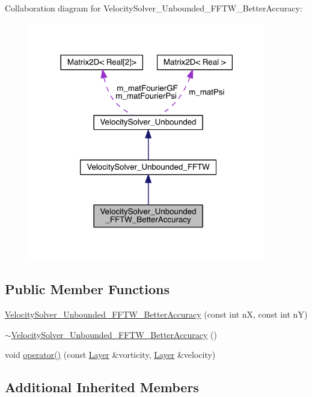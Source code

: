 Collaboration diagram for Velocity\+Solver\+\_\+\+Unbounded\+\_\+\+F\+F\+T\+W\+\_\+\+Better\+Accuracy\+:\nopagebreak
\begin{figure}[H]
\begin{center}
\leavevmode
\includegraphics[width=294pt]{dd/dd1/class_velocity_solver___unbounded___f_f_t_w___better_accuracy__coll__graph}
\end{center}
\end{figure}
\subsection*{Public Member Functions}
\begin{DoxyCompactItemize}
\item 
\hyperlink{class_velocity_solver___unbounded___f_f_t_w___better_accuracy_a83c87183908cd6a75e46c789156db1de}{Velocity\+Solver\+\_\+\+Unbounded\+\_\+\+F\+F\+T\+W\+\_\+\+Better\+Accuracy} (const int n\+X, const int n\+Y)
\item 
\hyperlink{class_velocity_solver___unbounded___f_f_t_w___better_accuracy_abc43c362d0de7b3b256b1989ff316aa7}{$\sim$\+Velocity\+Solver\+\_\+\+Unbounded\+\_\+\+F\+F\+T\+W\+\_\+\+Better\+Accuracy} ()
\item 
void \hyperlink{class_velocity_solver___unbounded___f_f_t_w___better_accuracy_a198cd7b4b476ce4c9d9284e16ec29883}{operator()} (const \hyperlink{struct_layer}{Layer} \&vorticity, \hyperlink{struct_layer}{Layer} \&velocity)
\end{DoxyCompactItemize}
\subsection*{Additional Inherited Members}


